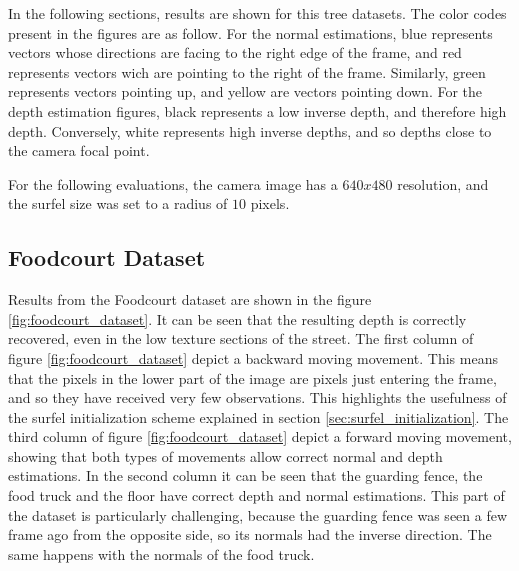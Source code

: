 \documentclass[1p]{elsarticle}
\begin{document}
In the following sections, results are shown for this tree datasets. The color codes present in the figures are as follow. For the normal estimations, blue represents vectors whose directions are facing to the right edge of the frame, and red represents vectors wich are pointing to the right of the frame. Similarly, green represents vectors pointing up, and yellow are vectors pointing down. For the depth estimation figures, black represents a low inverse depth, and therefore high depth. Conversely, white represents high inverse depths, and so depths close to the camera focal point.

For the following evaluations, the camera image has a $640x480$ resolution, and the surfel size was set to a radius of $10$ pixels.

\subsection{Foodcourt Dataset}

Results from the Foodcourt dataset are shown in the figure \ref{fig:foodcourt_dataset}. It can be seen that the resulting depth is correctly recovered, even in the low texture sections of the street. The first column of figure \ref{fig:foodcourt_dataset} depict a backward moving movement. This means that the pixels in the lower part of the image are pixels just entering the frame, and so they have received very few observations. This highlights the usefulness of the surfel initialization scheme explained in section \ref{sec:surfel_initialization}. The third column of figure \ref{fig:foodcourt_dataset} depict a forward moving movement, showing that both types of movements allow correct normal and depth estimations. In the second column it can be seen that the guarding fence, the food truck and the floor have correct depth and normal estimations. This part of the dataset is particularly challenging, because the guarding fence was seen a few frame ago from the opposite side, so its normals had the inverse direction. The same happens with the normals of the food truck.
\end{document}
